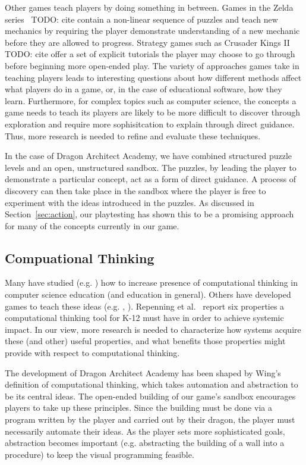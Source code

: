 \documentclass{sig-alternate}
\newcommand{\TODO}[1]{{\color{red} TODO: #1}}
\newcommand{\gametitle}{{\color{RoyalPurple} Dragon Architect Academy}}
\begin{document}
Other games teach players by doing something in between. 
Games in the Zelda series~\TODO{cite} contain a non-linear sequence of puzzles and teach new mechanics by requiring the player demonstrate understanding of a new mechanic before they are allowed to progress. 
Strategy games such as Crusader Kings II~\TODO{cite} offer a set of explicit tutorials the player may choose to go through before beginning more open-ended play.
The variety of approaches games take in teaching players leads to interesting questions about how different methods affect what players do in a game, or, in the case of educational software, how they learn. 
Furthermore, for complex topics such as computer science, the concepts a game needs to teach its players are likely to be more difficult to discover through exploration and require more sophisitcation to explain through direct guidance. Thus, more research is needed to refine and evaluate these techniques. 

In the case of \gametitle{}, we have combined structured puzzle levels and an open, unstructured sandbox. 
The puzzles, by leading the player to demonstrate a particular concept, act as a form of direct guidance. 
A process of discovery can then take place in the sandbox where the player is free to experiment with the ideas introduced in the puzzles. 
As discussed in Section~\ref{sec:action}, our playtesting has shown this to be a promising approach for many of the concepts currently in our game. 

\subsection{Compuational Thinking}

Many have studied (e.g. \cite{barr2011bringing}) how to increase presence of computational thinking in computer science education (and education in general). 
Others have developed games to teach these ideas (e.g. \cite{weintrop2013robobuilder}, \cite{kazimoglu2012serious}). 
Repenning et al.~\cite{repenning2010scalable} report six properties a computational thinking tool for K-12 must have in order to achieve systemic impact. 
In our view, more research is needed to characterize how systems acquire these (and other) useful properties, and what benefits those properties might provide with respect to computational thinking. 

The development of \gametitle{} has been shaped by Wing's~\cite{wing2008computational} definition of computational thinking, which takes automation and abstraction to be its central ideas. 
The open-ended building of our game's sandbox encourages players to take up these principles. 
Since the building must be done via a program written by the player and carried out by their dragon, the player must necessarily automate their ideas. 
As the player sets more sophisticated goals, abstraction becomes important (e.g. abstracting the building of a wall into a procedure) to keep the visual programming feasible. 
\end{document}
